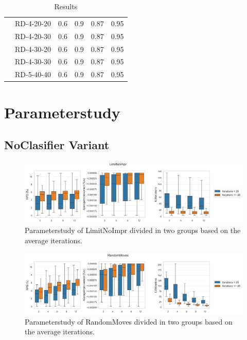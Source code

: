 \begin{table}[ht]
\begin{tabular}{c c c c c c}
                                        & RD-4-20-20 & 0.6             & 0.9         & 0.87     & 0.95     \\
                                        & RD-4-20-30 & 0.6             & 0.9         & 0.87     & 0.95     \\
                                        & RD-4-30-20 & 0.6             & 0.9         & 0.87     & 0.95     \\
                                        & RD-4-30-30 & 0.6             & 0.9         & 0.87     & 0.95     \\
                                        & RD-5-40-40 & 0.6             & 0.9         & 0.87     & 0.95     \\
        \bottomrule
    \end{tabular}
    \caption{Results}
    \label{tab:dataset_model_selection_randomStrategy}
\end{table}

\clearpage


\section{Parameterstudy}

\subsection{NoClasifier Variant}
\label{app:subsec:parameterstudy_noclassifier}

\begin{figure}[!ht]
    \centering
    \includegraphics[width=\textwidth]{pictures/parameter_study/LimitNoImpr_base_parameter_study.png}
    \caption{Parameterstudy of LimitNoImpr divided in two groups based on the average iterations.}
    \label{fig:parameterstudy_NoClassifier_limitNoImpr}
\end{figure}

\begin{figure}[!ht]
    \centering
    \includegraphics[width=\textwidth]{pictures/parameter_study/RandomMoves_base_parameter_study.png}
    \caption{Parameterstudy of RandomMoves divided in two groups based on the average iterations.}
    \label{fig:parameterstudy_NoClassifier_RandomMoves}
\end{figure}

